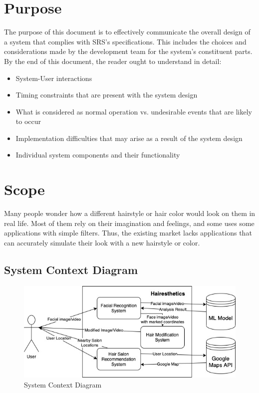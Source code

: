\documentclass[12pt, titlepage]{article}
\begin{document}
\section{Purpose}
The purpose of this document is to effectively communicate the overall design of a system that complies with SRS's specifications. This includes the choices and considerations made by the development team for the system's constituent parts. By the end of this document, the reader ought to understand in detail:
\begin{itemize}
    \item System-User interactions
    \item Timing constraints that are present with the system design
    \item What is considered as normal operation vs. undesirable events that are likely to occur
    \item Implementation difficulties that may arise as a result of the system design
    \item Individual system components and their functionality
\end{itemize}

\section{Scope}
\noident Many people wonder how a different hairstyle or hair color would look on them in real life. Most of them rely on their imagination and feelings, and some uses some applications with simple filters. Thus, the existing market lacks applications that can accurately simulate their look with a new hairstyle or color.

\subsection{System Context Diagram}
\begin{center}
\begin{figure}[H]
\graphicspath{ {system_context.jpg} }
\includegraphics[width=1\textwidth]{system_context}
\caption{System Context Diagram}
\label{Fig_SystemContext} 
\end{figure}
\end{center}
\end{document}
